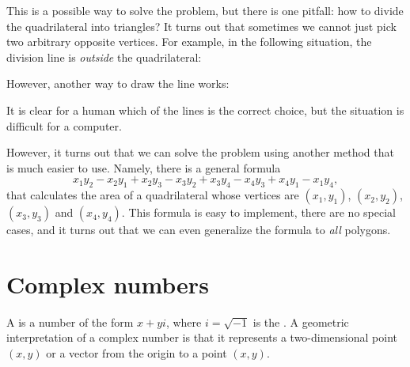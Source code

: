 This is a possible way to solve the problem,
but there is one pitfall:
how to divide the quadrilateral into triangles?
It turns out that sometimes we cannot just pick
two arbitrary opposite vertices.
For example, in the following situation,
the division line is \emph{outside} the quadrilateral:
\begin{center}
\end{center}
However, another way to draw the line works:
\begin{center}
\end{center}
It is clear for a human which of the lines is the correct
choice, but the situation is difficult for a computer.
                           
However, it turns out that we can solve the problem using
another method that is much easier to use.
Namely, there is a general formula
\[x_1y_2-x_2y_1+x_2y_3-x_3y_2+x_3y_4-x_4y_3+x_4y_1-x_1y_4,\]
that calculates the area of a quadrilateral
whose vertices are
$(x_1,y_1)$,
$(x_2,y_2)$,
$(x_3,y_3)$ and
$(x_4,y_4)$.
This formula is easy to implement, there are no special
cases, and it turns out that we can even generalize the formula
to \emph{all} polygons.

\section{Complex numbers}


A  is a number of the form $x+y i$,
where $i = \sqrt{-1}$ is the .
A geometric interpretation of a complex number is
that it represents a two-dimensional point $(x,y)$
or a vector from the origin to a point $(x,y)$.

